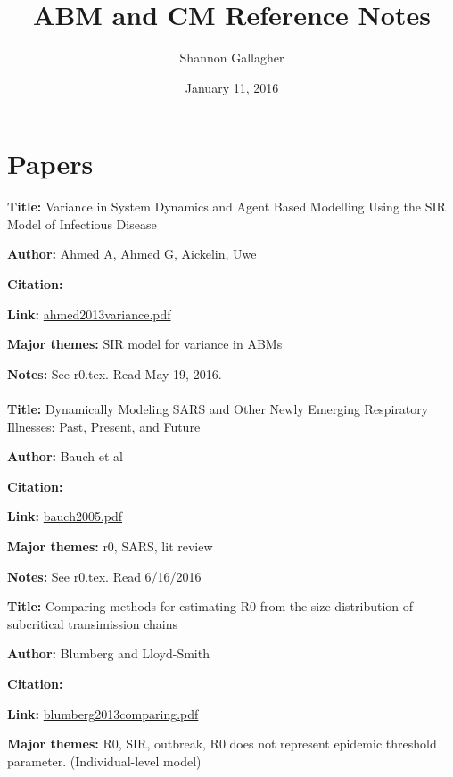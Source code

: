 \message{ !name(refs.tex)}\documentclass{article}
\begin{document}


\title{ABM and CM Reference Notes}
\author{Shannon Gallagher}
\date{January 11, 2016}
\maketitle


\section{Papers}

\textbf{Title:} Variance in System Dynamics and Agent Based Modelling Using the SIR Model of Infectious Disease

\textbf{Author:}  Ahmed A, Ahmed G, Aickelin, Uwe

\textbf{Citation:} \cite{ahmed2013variance}

\textbf{Link:} \url{ahmed2013variance.pdf}

\textbf{Major themes:}  SIR model for variance in ABMs

\textbf{Notes:} See r0.tex.  Read May 19, 2016.\\
\\

\textbf{Title:} Dynamically Modeling SARS and Other Newly Emerging Respiratory Illnesses: Past, Present, and Future 

\textbf{Author:}  Bauch et al

\textbf{Citation:} \cite{bauch2005}

\textbf{Link:} \url{bauch2005.pdf}

\textbf{Major themes:}  r0, SARS, lit review

\textbf{Notes:} See r0.tex.  Read 6/16/2016


\textbf{Title:}  Comparing methods for estimating R0 from the size distribution of subcritical transimission chains

\textbf{Author:}  Blumberg and Lloyd-Smith

\textbf{Citation:}\cite{blumberg2013comparing}

\textbf{Link:} \url{blumberg2013comparing.pdf}

\textbf{Major themes:}  R0, SIR, outbreak, R0 does not represent epidemic threshold parameter.  (Individual-level model)
\end{document}
